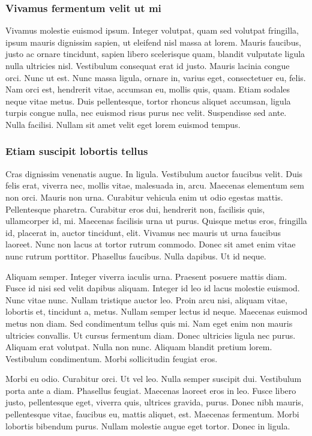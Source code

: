 \subsubsection{Vivamus fermentum velit ut mi}
Vivamus molestie euismod ipsum. Integer volutpat, quam sed volutpat fringilla, ipsum mauris dignissim sapien, ut eleifend nisl massa at lorem. Mauris faucibus, justo ac ornare tincidunt, sapien libero scelerisque quam, blandit vulputate ligula nulla ultricies nisl. Vestibulum consequat erat id justo. Mauris lacinia congue orci. Nunc ut est. Nunc massa ligula, ornare in, varius eget, consectetuer eu, felis. Nam orci est, hendrerit vitae, accumsan eu, mollis quis, quam. Etiam sodales neque vitae metus. Duis pellentesque, tortor rhoncus aliquet accumsan, ligula turpis congue nulla, nec euismod risus purus nec velit. Suspendisse sed ante. Nulla facilisi. Nullam sit amet velit eget lorem euismod tempus.

\subsubsection{Etiam suscipit lobortis tellus}
Cras dignissim venenatis augue. In ligula. Vestibulum auctor faucibus velit. Duis felis erat, viverra nec, mollis vitae, malesuada in, arcu. Maecenas elementum sem non orci. Mauris non urna. Curabitur vehicula enim ut odio egestas mattis. Pellentesque pharetra. Curabitur eros dui, hendrerit non, facilisis quis, ullamcorper id, mi. Maecenas facilisis urna ut purus. Quisque metus eros, fringilla id, placerat in, auctor tincidunt, elit. Vivamus nec mauris ut urna faucibus laoreet. Nunc non lacus at tortor rutrum commodo. Donec sit amet enim vitae nunc rutrum porttitor. Phasellus faucibus. Nulla dapibus. Ut id neque.

Aliquam semper. Integer viverra iaculis urna. Praesent posuere mattis diam. Fusce id nisi sed velit dapibus aliquam. Integer id leo id lacus molestie euismod. Nunc vitae nunc. Nullam tristique auctor leo. Proin arcu nisi, aliquam vitae, lobortis et, tincidunt a, metus. Nullam semper lectus id neque. Maecenas euismod metus non diam. Sed condimentum tellus quis mi. Nam eget enim non mauris ultricies convallis. Ut cursus fermentum diam. Donec ultricies ligula nec purus. Aliquam erat volutpat. Nulla non nunc. Aliquam blandit pretium lorem. Vestibulum condimentum. Morbi sollicitudin feugiat eros.

Morbi eu odio. Curabitur orci. Ut vel leo. Nulla semper suscipit dui. Vestibulum porta ante a diam. Phasellus feugiat. Maecenas laoreet eros in leo. Fusce libero justo, pellentesque eget, viverra quis, ultrices gravida, purus. Donec nibh mauris, pellentesque vitae, faucibus eu, mattis aliquet, est. Maecenas fermentum. Morbi lobortis bibendum purus. Nullam molestie augue eget tortor. Donec in ligula.

